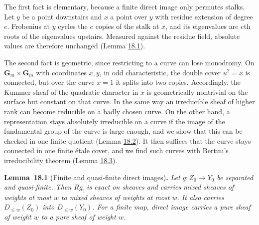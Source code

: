 \documentclass[11pt]{article}
\newenvironment{bpstatement}[2]{\par\addvspace{0.6\baselineskip}\noindent\textbf{#1}#2\textbf{.}\enspace\ignorespaces}
  {\par\addvspace{0.4\baselineskip}}
\newenvironment{bpstatementit}[2]{\begin{bpstatement}{#1}{#2}\itshape\ignorespaces}{\end{bpstatement}}
\begin{document}
The first fact is elementary, because a finite direct image only permutes stalks. Let \(y\) be a point downstairs and \(x\) a point over \(y\) with residue extension of degree \(e\). Frobenius at \(y\) cycles the \(e\) copies of the stalk at \(x\), and its eigenvalues are \(e\)th roots of the eigenvalues upstairs. Measured against the residue field, absolute values are therefore unchanged (Lemma \hyperref[bp5]{18.1}).

The second fact is geometric, since restricting to a curve can lose monodromy. On \(\mathbf G_m\times\mathbf G_m\) with coordinates \(x,y\), in odd characteristic, the double cover \(u^2=x\) is connected, but over the curve \(x=1\) it splits into two copies. Accordingly, the Kummer sheaf of the quadratic character in \(x\) is geometrically nontrivial on the surface but constant on that curve. In the same way an irreducible sheaf of higher rank can become reducible on a badly chosen curve. On the other hand, a representation stays absolutely irreducible on a curve if the image of the fundamental group of the curve is large enough, and we show that this can be checked in one finite quotient (Lemma \hyperref[bp8]{18.2}). It then suffices that the curve stays connected in one finite étale cover, and we find such curves with Bertini's irreducibility theorem (Lemma \hyperref[bp11]{18.3}).

\label{bp5}%
\begin{bpstatementit}{Lemma~18.1}{ (Finite and quasi-finite direct images)}
Let \(g:Z_0\to Y_0\) be separated and quasi-finite. Then \(Rg_!\) is exact on sheaves and carries mixed sheaves of weights at most \(w\) to mixed sheaves of weights at most \(w\). It also carries \(D_{\leq w}(Z_0)\) into \(D_{\leq w}(Y_0)\). For a finite map, direct image carries a pure sheaf of weight \(w\) to a pure sheaf of weight \(w\).
\end{bpstatementit}
\end{document}
